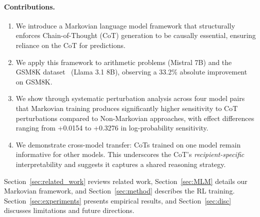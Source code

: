 \documentclass[letterpaper]{article} %
\begin{document}
\paragraph{Contributions.}
\begin{enumerate}
    \item We introduce a Markovian language model framework that structurally enforces Chain-of-Thought (CoT) generation to be causally essential, ensuring reliance on the CoT for predictions.
    \item We apply this framework to arithmetic problems (Mistral 7B) and the GSM8K dataset~\citep{cobbe2021gsm8k} (Llama 3.1 8B), observing a 33.2\% absolute improvement on GSM8K.
    \item We show through systematic perturbation analysis across four model pairs that Markovian training produces significantly higher sensitivity to CoT perturbations compared to Non-Markovian approaches, with effect differences ranging from +0.0154 to +0.3276 in log-probability sensitivity.
    \item We demonstrate cross-model transfer: CoTs trained on one model remain informative for other models. This underscores the CoT's \emph{recipient-specific} interpretability and suggests it captures a shared reasoning strategy.
\end{enumerate}

Section~\ref{sec:related_work} reviews related work, Section~\ref{sec:MLM} details our Markovian framework, and Section~\ref{sec:method} describes the RL training. Section~\ref{sec:experiments} presents empirical results, and Section~\ref{sec:disc} discusses limitations and future directions.
\end{document}
